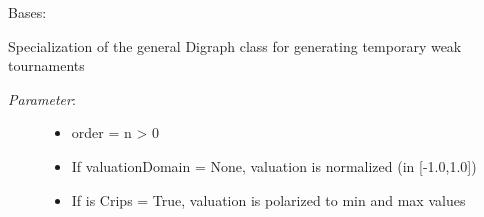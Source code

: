 \documentclass[letterpaper,10pt,english]{sphinxmanual}
\begin{document}
\begin{fulllineitems}
\label{techDoc:randomDigraphs.RandomTournament}
Bases: {\hyperref[techDoc:digraphs.Digraph]{\emph{}}}

Specialization of the general Digraph class for generating
temporary weak tournaments
\begin{description}
\item[{\emph{Parameter}:}] \leavevmode\begin{itemize}
\item {} 
order = n \textgreater{} 0

\item {} 
If valuationDomain = None, valuation is normalized (in {[}-1.0,1.0{]})

\item {} 
If is Crips = True, valuation is polarized to min and max values

\end{itemize}

\end{description}

\end{fulllineitems}

\end{document}
